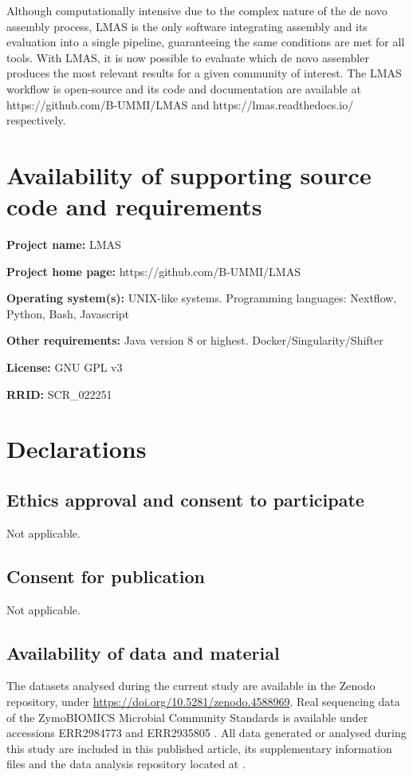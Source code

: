 Although computationally intensive due to the complex nature of the de novo assembly process, LMAS is the only software integrating assembly and its evaluation into a single pipeline, guaranteeing the same conditions are met for all tools. With LMAS, it is now possible to evaluate which de novo assembler produces the most relevant results for a given community of interest. The LMAS workflow is open-source and its code and documentation are available at https://github.com/B-UMMI/LMAS and https://lmas.readthedocs.io/ respectively.

\section{Availability of supporting source code and requirements}

\textbf{Project name:} LMAS

\textbf{Project home page: }https://github.com/B-UMMI/LMAS 

\textbf{Operating system(s):} UNIX-like systems.
Programming languages: Nextflow, Python, Bash, Javascript

\textbf{Other requirements: }Java version 8 or highest. Docker/Singularity/Shifter

\textbf{License: } GNU GPL v3

\textbf{RRID:} SCR\_022251


\section{Declarations}

\subsection{Ethics approval and consent to participate}

Not applicable.

\subsection{Consent for publication}

Not applicable.

\subsection{Availability of data and material}

The datasets analysed during the current study are available in the Zenodo repository, under \url{https://doi.org/10.5281/zenodo.4588969}. Real sequencing data of the ZymoBIOMICS Microbial Community Standards is available under accessions ERR2984773 and ERR2935805 \cite{nicholls_ultra-deep_2019}. All data generated or analysed during this study are included in this published article, its supplementary information files and the data analysis repository located at \cite{noauthor_lmas_2022}.

